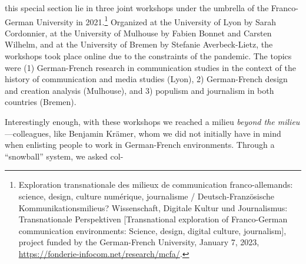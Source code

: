 \documentclass{tufte-handout}
\begin{document}
\begin{titlepage}
\begin{fullwidth}
\vspace*{0.75em} 

\vspace*{0.5em}


\end{fullwidth}

\vspace*{1em}


 this special section lie in three joint workshops under the
umbrella of the Franco-German University in 2021.\footnote{Exploration
  transnationale des milieux de communication franco-allemands: science,
  design, culture numérique, journalisme / Deutsch-Französische
  Kommunikationsmilieus? Wissenschaft, Digitale Kultur und Journalismus:
  Transnationale Perspektiven {[}Transnational exploration of
  Franco-German communication environments: Science, design, digital
  culture, journalism{]}, project funded by the German-French
  University, January 7, 2023,
  \url{https://fonderie-infocom.net/research/mcfa/}.} Organized at the
University of Lyon by Sarah Cordonnier, at the University of Mulhouse by
Fabien Bonnet and Carsten Wilhelm, and at the University of Bremen by
Stefanie Averbeck-Lietz, the workshops took place online due to the
constraints of the pandemic. The topics were (1) German-French research
in communication studies in the context of the history of communication
and media studies (Lyon), 2) German-French design and creation analysis
(Mulhouse), and 3) populism and journalism in both countries (Bremen).

Interestingly enough, with these workshops we reached a milieu
\emph{beyond the milieu}---colleagues, like Benjamin Krämer, whom we did
not initially have in mind when enlisting people to work in German-French environments. Through a ``snowball'' system, we asked col-


\enlargethispage{2\baselineskip}

\vspace*{2em}



 \end{titlepage}

\end{document}
